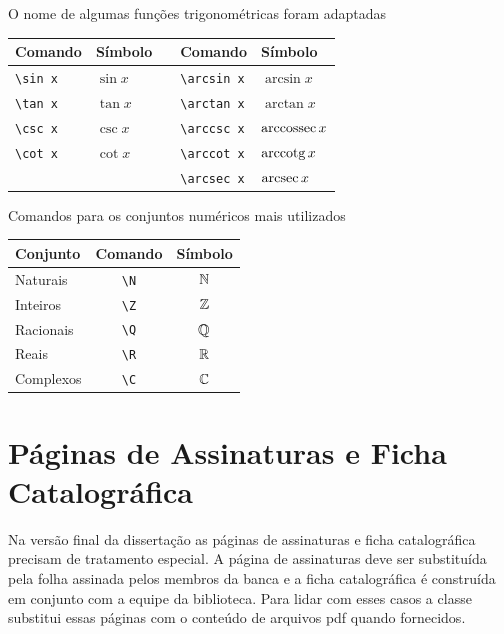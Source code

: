 \documentclass[fleqn]{profmat-cefet}
\begin{document}
O nome de algumas funções trigonométricas foram adaptadas
\begin{center}
    \begin{tabular}{llcll}
    	\hline
    	Comando            & Símbolo  & \null\hspace{2cm}\null & Comando               & Símbolo     \\ \hline
    	\lstinline!\sin x! & $\sin x$ &                        & \lstinline!\arcsin x! & $\arcsin x$ \\
    	\lstinline!\tan x! & $\tan x$ &                        & \lstinline!\arctan x! & $\arctan x$ \\
    	\lstinline!\csc x! & $\csc x$ &                        & \lstinline!\arccsc x! & $\operatorname{arccossec} x$ \\
    	\lstinline!\cot x! & $\cot x$ &                        & \lstinline!\arccot x! & $\operatorname{arccotg} x$ \\
    	                   &          &                        & \lstinline!\arcsec x! & $\operatorname{arcsec} x$ \\ \hline
    \end{tabular}
\end{center}

Comandos para os conjuntos numéricos mais utilizados
\begin{center}
    \begin{tabular}{lcc}
            \hline
            Conjunto  &    Comando     & Símbolo \\ \hline
            Naturais  & \lstinline!\N! &  $\mathbb{N}$   \\
            Inteiros  & \lstinline!\Z! &  $\mathbb{Z}$   \\
            Racionais & \lstinline!\Q! &  $\mathbb{Q}$   \\
            Reais     & \lstinline!\R! &  $\mathbb{R}$   \\
            Complexos & \lstinline!\C! &  $\mathbb{C}$   \\ \hline
    \end{tabular}
\end{center}

\section{Páginas de Assinaturas e Ficha Catalográfica}
\label{sec:paginas_de_assinatura_e_ficha_catalografica}

Na versão final da dissertação as páginas de assinaturas e ficha catalográfica
precisam de tratamento especial. A página de assinaturas deve ser
substituída pela folha assinada pelos membros da banca e a ficha catalográfica
é construída em conjunto com a equipe da biblioteca.
Para lidar com esses casos a classe substitui essas páginas com o 
conteúdo de arquivos \textsf{pdf} quando fornecidos.
\end{document}
